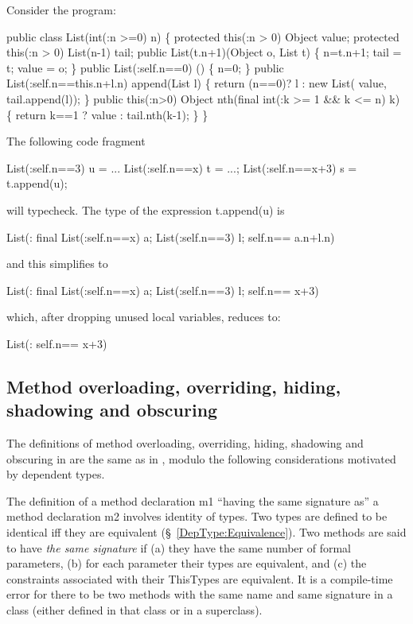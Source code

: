 \begin{example}
Consider the program:
  \begin{x10}
public class List(int(:n >=0) n) \{
  protected this(:n > 0) Object  value;
  protected this(:n > 0) List(n-1)  tail;
  public List(t.n+1)(Object o, List t) \{
      n=t.n+1;
      tail = t;
      value = o;
  \}
  public List(:self.n==0) () \{
      n=0;
  \}
  public List(:self.n==this.n+l.n) append(List l) \{
      return (n==0)? l 
         : new List( value, tail.append(l)); 
  \}
  public this(:n>0) 
    Object nth(final int(:k >= 1 \&\& k <= n) k) \{
      return k==1 ? value : tail.nth(k-1);
  \}
\}
  \end{x10}

The following code fragment
\begin{x10}
List(:self.n==3) u = ...
List(:self.n==x) t = ...;
List(:self.n==x+3) s = t.append(u);
\end{x10}
\noindent will typecheck. The type of the expression {\cf t.append(u)} is 
\begin{x10}
List(: final List(:self.n==x) a; 
       List(:self.n==3) l; self.n== a.n+l.n)  
\end{x10}
\noindent and this simplifies to
\begin{x10}
List(: final List(:self.n==x) a; 
       List(:self.n==3) l; self.n== x+3)  
\end{x10}
\noindent which, after dropping unused local variables, reduces to:
\begin{x10}
List(: self.n== x+3)  
\end{x10}
\end{example}

\subsection{Method overloading, overriding, hiding, shadowing and obscuring}

The definitions of method overloading, overriding, hiding, shadowing
and obscuring in \Xten{} are the same as in \Java, modulo the following
considerations motivated by dependent types.

The definition of a method declaration {\cf m1} ``having the same signature
as'' a method declaration {\cf m2} involves identity of types. Two \Xten{} types
are defined to be identical iff they are equivalent (\S~\ref{DepType:Equivalence}).
Two methods are said to have {\em the same signature} if (a)
they have the same number of formal parameters, (b) for each parameter
their types are equivalent, and (c) the constraints associated with
their ThisTypes are equivalent. It is a compile-time error for there
to be two methods with the same name and same signature in a class
(either defined in that class or in a superclass).

